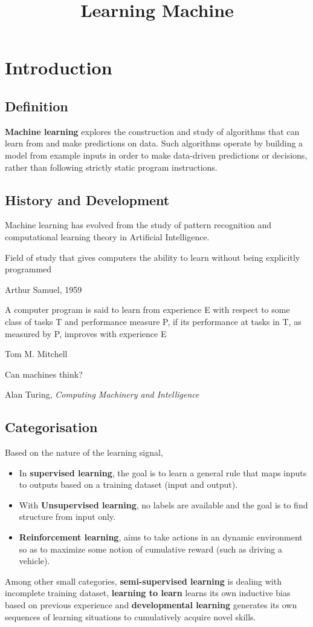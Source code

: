 \documentclass[twocolumn]{article}
\title{Learning Machine}
\date{\vspace{-6ex}}
\numberwithin{equation}{section}
\begin{document}
\maketitle



\section{Introduction}

	\subsection{Definition}
\begin{framed}
\textbf{Machine learning} explores the construction and study of algorithms that can learn from and make predictions on data. Such algorithms operate by building a model from example inputs in order to make data-driven predictions or decisions, rather than following strictly static program instructions.
\end{framed}

	\subsection{History and Development}
Machine learning has evolved from the study of pattern recognition and computational learning theory in Artificial Intelligence.

\epigraph{Field of study that gives computers the ability to learn without being explicitly programmed}{Arthur Samuel, 1959}

\epigraph{A computer program is said to learn from experience E with respect to some class of tasks T and performance measure P, if its performance at tasks in T, as measured by P, improves with experience E}{Tom M. Mitchell}

\epigraph{Can machines think?}{Alan Turing, \textit{Computing Machinery and Intelligence}}

	\subsection{Categorisation}
Based on the nature of the learning signal,
\begin{itemize}
	\item In \textbf{supervised learning}, the goal is to learn a general rule that maps inputs to outputs based on a training dataset (input and output). 
	\item With \textbf{Unsupervised learning}, no labels are available and the goal is to find structure from input only.
	\item \textbf{Reinforcement learning}, aims to take actions in an dynamic environment so as to maximize some notion of cumulative reward (such as driving a vehicle).
\end{itemize}
 Among other small categories, \textbf{semi-supervised learning} is dealing with incomplete training dataset, \textbf{learning to learn} learns its own inductive bias based on previous experience and \textbf{developmental learning} generates its own sequences of learning situations to cumulatively acquire novel skills.
 
\end{document}
